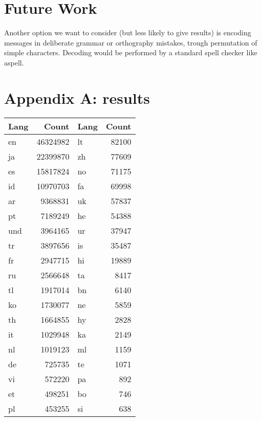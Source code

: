 \documentclass[a4paper,11pt]{article}
\begin{document}
\section{Future Work}

Another option we want to consider (but less likely to give results) is encoding messages in deliberate grammar or orthography mistakes, trough permutation of simple characters. Decoding would be performed by a standard spell checker like aspell.



\section{Appendix A: results}

\begin{table}
\centering
\begin{tabular}{|l|r||l|r|}
\hline
Lang & Count & Lang & Count \\
\hline
en & 46324982 &             lt & 82100 \\
ja & 22399870 &             zh & 77609 \\
es & 15817824 &             no & 71175 \\
id & 10970703 &             fa & 69998 \\
ar & 9368831 &                      uk & 57837 \\
pt & 7189249 &                      he & 54388 \\
und & 3964165 &             ur & 37947 \\
tr & 3897656 &                      is & 35487 \\
fr & 2947715 &                      hi & 19889 \\
ru & 2566648 &                      ta & 8417 \\
tl & 1917014 &                      bn & 6140 \\
ko & 1730077 &                      ne & 5859 \\
th & 1664855 &                      hy & 2828 \\
it & 1029948 &                      ka & 2149 \\
nl & 1019123 &                      ml & 1159 \\
de & 725735 &                       te & 1071 \\
vi & 572220 &                       pa & 892 \\
et & 498251 &                       bo & 746 \\
pl & 453255 &                       si & 638 \\

\end{tabular}
\end{table}
\end{document}
